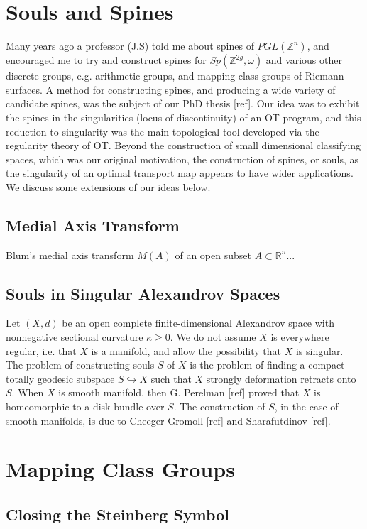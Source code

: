 \documentclass[12pt]{amsart}
\theoremstyle{remark}
\newcommand{\bR}{\mathbb{R}}
\newcommand{\bZ}{\mathbb{Z}}
\begin{document}






\section{Souls and Spines}
Many years ago a professor (J.S) told me about spines of $PGL(\mathbb{Z}^n)$, and encouraged me to try and construct spines for $Sp(\bZ^{2g}, \omega)$ and various other discrete groups, e.g. arithmetic groups, and mapping class groups of Riemann surfaces. A method for constructing spines, and producing a wide variety of candidate spines, was the subject of our PhD thesis [ref]. Our idea was to exhibit the spines in the singularities (locus of discontinuity) of an OT program, and this reduction to singularity was the main topological tool developed via the regularity theory of OT. Beyond the construction of small dimensional classifying spaces, which was our original motivation, the construction of spines, or souls, as the singularity of an optimal transport map appears to have wider applications. We discuss some extensions of our ideas below.

\subsection{Medial Axis Transform}

Blum's medial axis transform $M(A)$ of an open subset $A\subset \bR^n$...


\subsection{Souls in Singular Alexandrov Spaces}
Let $(X,d)$ be an open complete finite-dimensional Alexandrov space with nonnegative sectional curvature $\kappa \geq 0$. We do not assume $X$ is everywhere regular, i.e. that $X$ is a manifold, and allow the possibility that $X$ is singular. The problem of constructing souls $S$ of $X$ is the problem of finding a compact totally geodesic subspace $S \hookrightarrow X$ such that $X$ strongly deformation retracts onto $S$. When $X$ is smooth manifold, then G. Perelman [ref] proved that $X$ is homeomorphic to a disk bundle over $S$. The construction of $S$, in the case of smooth manifolds, is due to Cheeger-Gromoll [ref] and Sharafutdinov [ref]. 





\section{Mapping Class Groups}
\subsection{Closing the Steinberg Symbol}

\section{}




\printbibliography[title={References}]
\end{document}
